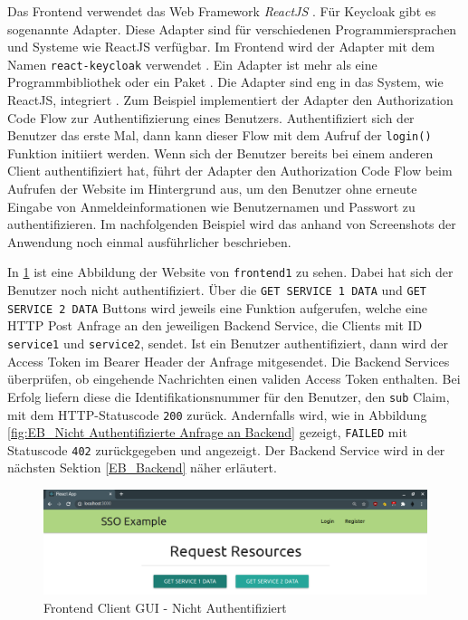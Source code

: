 Das Frontend verwendet das Web Framework \textit{ReactJS} \cite{EB43}. Für Keycloak gibt es sogenannte Adapter. Diese Adapter sind für verschiedenen Programmiersprachen und Systeme wie ReactJS verfügbar. Im Frontend wird der Adapter mit dem Namen \texttt{react-keycloak} verwendet \cite{EB36}. Ein Adapter ist mehr als eine Programmbibliothek oder ein Paket \cite{EB43}. Die Adapter sind eng in das System, wie ReactJS, integriert \cite{EB43}. Zum Beispiel implementiert der Adapter den Authorization Code Flow zur Authentifizierung eines Benutzers. Authentifiziert sich der Benutzer das erste Mal, dann kann dieser Flow mit dem Aufruf der \texttt{login()} Funktion initiiert werden. Wenn sich der Benutzer bereits bei einem anderen Client authentifiziert hat, führt der Adapter den Authorization Code Flow beim Aufrufen der Website im Hintergrund aus, um den Benutzer ohne erneute Eingabe von Anmeldeinformationen wie Benutzernamen und Passwort zu authentifizieren. Im nachfolgenden Beispiel wird das anhand von Screenshots der Anwendung noch einmal ausführlicher beschrieben.

In \ref{fig:EB_Nicht Authentifiziert} ist eine Abbildung der Website von \texttt{frontend1} zu sehen. Dabei hat sich der Benutzer noch nicht authentifiziert. Über die \texttt{GET SERVICE 1 DATA} und \texttt{GET SERVICE 2 DATA} Buttons wird jeweils eine Funktion aufgerufen, welche eine HTTP Post Anfrage an den jeweiligen Backend Service, die Clients mit ID \texttt{service1} und \texttt{service2}, sendet. Ist ein Benutzer authentifiziert, dann wird der Access Token im Bearer Header der Anfrage mitgesendet. Die Backend Services überprüfen, ob eingehende Nachrichten einen validen Access Token enthalten. Bei Erfolg liefern diese die Identifikationsnummer für den Benutzer, den \texttt{sub} Claim, mit dem HTTP-Statuscode \texttt{200} zurück. Andernfalls wird, wie in Abbildung \ref{fig:EB_Nicht Authentifizierte Anfrage an Backend} gezeigt, \texttt{FAILED} mit Statuscode \texttt{402} zurückgegeben und angezeigt. Der Backend Service wird in der nächsten Sektion \ref{EB_Backend} näher erläutert.

\begin{figure}[!ht]
	\centering
	\includegraphics[width=1\textwidth]{Images/EbertScherer/FrontendLoggedOut.PNG}
	\caption{Frontend Client GUI - Nicht Authentifiziert}
	\label{fig:EB_Nicht Authentifiziert}
\end{figure}

